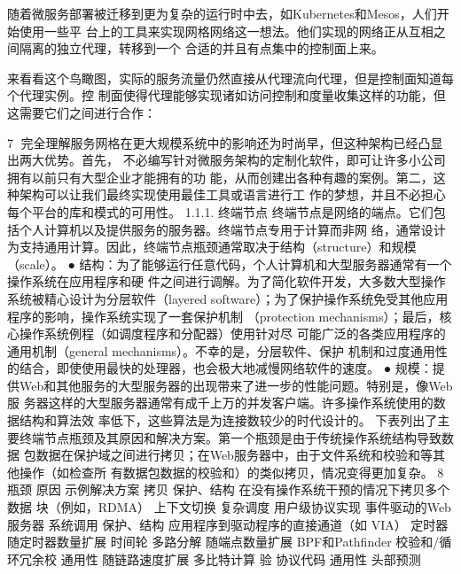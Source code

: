 随着微服务部署被迁移到更为复杂的运行时中去，如Kubernetes和Mesos，人们开始使用一些平
台上的工具来实现网格网络这一想法。他们实现的网络正从互相之间隔离的独立代理，转移到一个
合适的并且有点集中的控制面上来。




来看看这个鸟瞰图，实际的服务流量仍然直接从代理流向代理，但是控制面知道每个代理实例。控
制面使得代理能够实现诸如访问控制和度量收集这样的功能，但这需要它们之间进行合作：




                                                7
完全理解服务网格在更大规模系统中的影响还为时尚早，但这种架构已经凸显出两大优势。首先，
不必编写针对微服务架构的定制化软件，即可让许多小公司拥有以前只有大型企业才能拥有的功
能，从而创建出各种有趣的案例。第二，这种架构可以让我们最终实现使用最佳工具或语言进行工
作的梦想，并且不必担心每个平台的库和模式的可用性。
1.1.1.   终端节点
终端节点是网络的端点。它们包括个人计算机以及提供服务的服务器。终端节点专用于计算而非网
络，通常设计为支持通用计算。因此，终端节点瓶颈通常取决于结构（structure）和规模
（scale）。
 ● 结构：为了能够运行任意代码，个人计算机和大型服务器通常有一个操作系统在应用程序和硬
   件之间进行调解。为了简化软件开发，大多数大型操作系统被精心设计为分层软件（layered
   software）；为了保护操作系统免受其他应用程序的影响，操作系统实现了一套保护机制
   （protection mechanisms）；最后，核心操作系统例程（如调度程序和分配器）使用针对尽
   可能广泛的各类应用程序的通用机制（general mechanisms）。不幸的是，分层软件、保护
   机制和过度通用性的结合，即使使用最快的处理器，也会极大地减慢网络软件的速度。
 ● 规模：提供Web和其他服务的大型服务器的出现带来了进一步的性能问题。特别是，像Web服
   务器这样的大型服务器通常有成千上万的并发客户端。许多操作系统使用的数据结构和算法效
   率低下，这些算法是为连接数较少的时代设计的。
下表列出了主要终端节点瓶颈及其原因和解决方案。第一个瓶颈是由于传统操作系统结构导致数据
包数据在保护域之间进行拷贝；在Web服务器中，由于文件系统和校验和等其他操作（如检查所
有数据包数据的校验和）的类似拷贝，情况变得更加复杂。
                                                     8
 瓶颈             原因          示例解决方案
 拷贝             保护、结构       在没有操作系统干预的情况下拷贝多个数据
                            块（例如，RDMA）
 上下文切换          复杂调度        用户级协议实现 事件驱动的Web服务器
 系统调用           保护、结构       应用程序到驱动程序的直接通道（如 VIA）
 定时器            随定时器数量扩展    时间轮
 多路分解           随端点数量扩展     BPF和Pathfinder
 校验和/循环冗余校      通用性 随链路速度扩展 多比特计算
 验
 协议代码           通用性         头部预测

